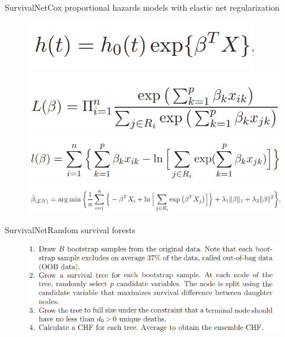 \documentclass[
]{beamer}
\begin{document}
	\begin{frame}[plain]{SurvivalNet}{Cox proportional hazards models with  elastic net regularization}
		\begin{figure}
			\includegraphics[scale=0.5]{cox1}\\
			\includegraphics[scale=0.5]{cox2}\\
			\includegraphics[scale=0.5]{cox3}\\
			\includegraphics[scale=0.29]{cox4}
		\end{figure}
	\end{frame}
	
	\begin{frame}[plain]{SurvivalNet}{Random survival forests}
		\begin{figure}
			\includegraphics[scale=0.6]{rsf}
		\end{figure}
	\end{frame}
	
\end{document}
